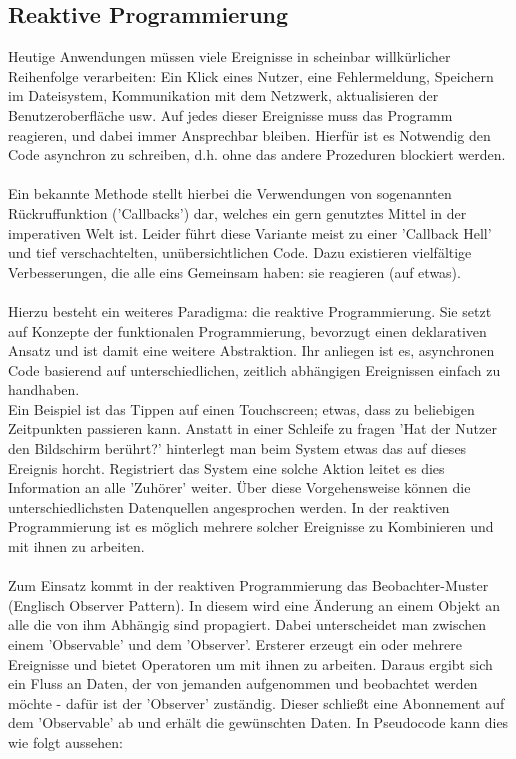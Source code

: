 \subsection{Reaktive Programmierung}
Heutige Anwendungen müssen viele Ereignisse in scheinbar willkürlicher Reihenfolge verarbeiten: Ein Klick eines Nutzer, eine Fehlermeldung, Speichern im Dateisystem, Kommunikation mit dem Netzwerk, aktualisieren der Benutzeroberfläche usw. Auf jedes dieser Ereignisse muss das Programm reagieren, und dabei immer Ansprechbar bleiben. Hierfür ist es Notwendig den Code asynchron zu schreiben, d.h. ohne das andere Prozeduren blockiert werden.
\\\\
Ein bekannte Methode stellt hierbei die Verwendungen von sogenannten Rückruffunktion ('Callbacks') dar, welches ein gern genutztes Mittel in der imperativen Welt ist. Leider führt diese Variante meist zu einer 'Callback Hell' und tief verschachtelten, unübersichtlichen Code. Dazu existieren vielfältige Verbesserungen, die alle eins Gemeinsam haben: sie reagieren (auf etwas).
\\\\
Hierzu besteht ein weiteres Paradigma: die reaktive Programmierung. Sie setzt auf Konzepte der funktionalen Programmierung, bevorzugt einen deklarativen Ansatz und ist damit eine weitere Abstraktion. Ihr anliegen ist es, asynchronen Code basierend auf unterschiedlichen, zeitlich abhängigen Ereignissen einfach zu handhaben.
\\
Ein Beispiel ist das Tippen auf einen Touchscreen; etwas, dass zu beliebigen Zeitpunkten passieren kann. Anstatt in einer Schleife zu fragen 'Hat der Nutzer den Bildschirm berührt?' hinterlegt man beim System etwas das auf dieses Ereignis horcht. Registriert das System eine solche Aktion leitet es dies Information an alle 'Zuhörer' weiter. Über diese Vorgehensweise können die unterschiedlichsten Datenquellen angesprochen werden. In der reaktiven Programmierung ist es möglich mehrere solcher Ereignisse zu Kombinieren und mit ihnen zu arbeiten.
\\\\
Zum Einsatz kommt in der reaktiven Programmierung das Beobachter-Muster (Englisch Observer Pattern). In diesem wird eine Änderung an einem Objekt an alle die von ihm Abhängig sind propagiert. Dabei unterscheidet man zwischen einem 'Observable' und dem 'Observer'. Ersterer erzeugt ein oder mehrere Ereignisse und bietet Operatoren um mit ihnen zu arbeiten. Daraus ergibt sich ein Fluss an Daten, der von jemanden aufgenommen und beobachtet werden möchte - dafür ist der 'Observer' zuständig. Dieser schließt eine Abonnement auf dem 'Observable' ab und erhält die gewünschten Daten. In Pseudocode kann dies wie folgt aussehen:
